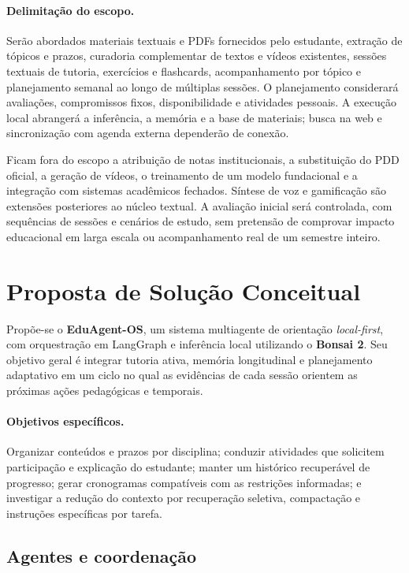 \documentclass[12pt]{article}
\begin{document}
\paragraph{Delimitação do escopo.}
Serão abordados materiais textuais e PDFs fornecidos pelo estudante, extração de tópicos e prazos, curadoria complementar de textos e vídeos existentes, sessões textuais de tutoria, exercícios e flashcards, acompanhamento por tópico e planejamento semanal ao longo de múltiplas sessões. O planejamento considerará avaliações, compromissos fixos, disponibilidade e atividades pessoais. A execução local abrangerá a inferência, a memória e a base de materiais; busca na web e sincronização com agenda externa dependerão de conexão.

Ficam fora do escopo a atribuição de notas institucionais, a substituição do PDD oficial, a geração de vídeos, o treinamento de um modelo fundacional e a integração com sistemas acadêmicos fechados. Síntese de voz e gamificação são extensões posteriores ao núcleo textual. A avaliação inicial será controlada, com sequências de sessões e cenários de estudo, sem pretensão de comprovar impacto educacional em larga escala ou acompanhamento real de um semestre inteiro.

\section{Proposta de Solução Conceitual}
\label{sec:solucao}

Propõe-se o \textbf{EduAgent-OS}, um sistema multiagente de orientação \textit{local-first}, com orquestração em LangGraph e inferência local utilizando o \textbf{Bonsai 2}. Seu objetivo geral é integrar tutoria ativa, memória longitudinal e planejamento adaptativo em um ciclo no qual as evidências de cada sessão orientem as próximas ações pedagógicas e temporais.

\paragraph{Objetivos específicos.}
Organizar conteúdos e prazos por disciplina; conduzir atividades que solicitem participação e explicação do estudante; manter um histórico recuperável de progresso; gerar cronogramas compatíveis com as restrições informadas; e investigar a redução do contexto por recuperação seletiva, compactação e instruções específicas por tarefa.

\subsection{Agentes e coordenação}
\end{document}
